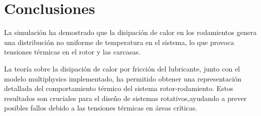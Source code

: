 \documentclass{article}
\theoremstyle{mytheoremstyle}
\theoremstyle{mytheoremstyle}
\theoremstyle{myproblemstyle}
\begin{document}
          \section{Conclusiones}
La simulación ha demostrado que la disipación de calor en los rodamientos genera una distribución no uniforme de temperatura en el sistema, lo que provoca tensiones térmicas en el rotor y las carcasas.

La teoría sobre la disipación de calor por fricción del lubricante, junto con el modelo multiphysics implementado, ha permitido obtener una representación detallada del comportamiento térmico del sistema rotor-rodamiento. Estos resultados son cruciales para el diseño de sistemas rotativos,ayudando a prever posibles fallos debido a las tensiones térmicas en áreas críticas.

\nocite{*}

\end{document}
